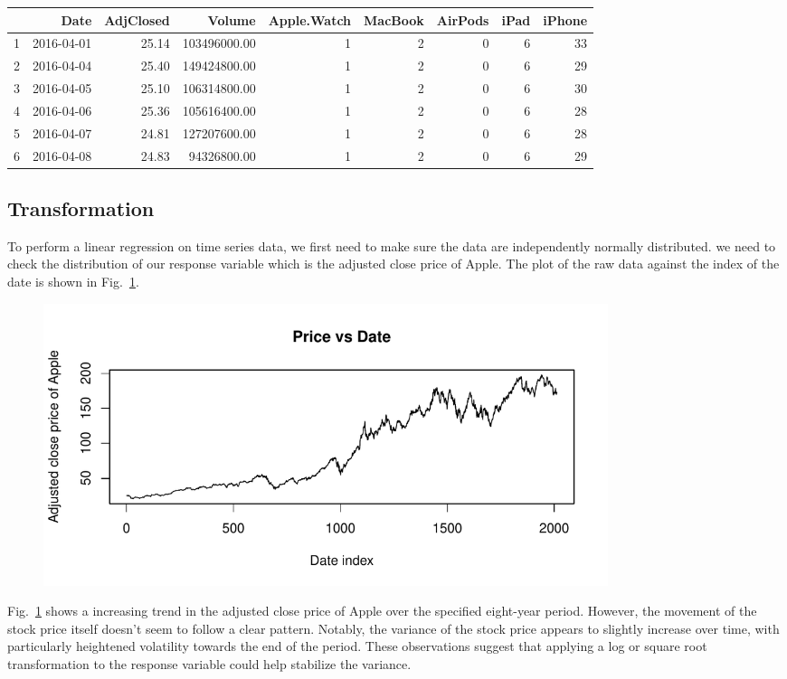 \documentclass[conference,onecolumn,11pt]{IEEEtran}
\begin{document}
\begin{table}[ht]
\centering
\begin{tabular}{rrrrrrrrr}
  \hline
 & Date & AdjClosed & Volume & Apple.Watch & MacBook & AirPods & iPad & iPhone \\ 
  \hline
1 & 2016-04-01 & 25.14 & 103496000.00 &   1 &   2 &   0 &   6 &  33 \\ 
  2 & 2016-04-04 & 25.40 & 149424800.00 &   1 &   2 &   0 &   6 &  29 \\ 
  3 & 2016-04-05 & 25.10 & 106314800.00 &   1 &   2 &   0 &   6 &  30 \\ 
  4 & 2016-04-06 & 25.36 & 105616400.00 &   1 &   2 &   0 &   6 &  28 \\ 
  5 & 2016-04-07 & 24.81 & 127207600.00 &   1 &   2 &   0 &   6 &  28 \\ 
  6 & 2016-04-08 & 24.83 & 94326800.00 &   1 &   2 &   0 &   6 &  29 \\ 
   \hline
\end{tabular}
\label{tab:merged_data}
\end{table}

\subsection*{Transformation}

To perform a linear regression on time series data, we first need to make sure the data are independently normally distributed. we need to check the distribution of our response variable which is the adjusted close price of Apple.
The plot of the raw data against the index of the date is shown in Fig.~\ref{fig:price}.

\begin{figure}[htpb]
	\centering
	\includegraphics[width=0.8\textwidth]{pic/Price_vs_Date.pdf}
	\caption{}
	\label{fig:price}
\end{figure}

Fig.~\ref{fig:price} shows a increasing trend in the adjusted close price of Apple over the specified eight-year period. However, the movement of the stock price itself doesn't seem to follow a clear pattern. Notably, the variance of the stock price appears to slightly increase over time, with particularly heightened volatility towards the end of the period. These observations suggest that applying a log or square root transformation to the response variable could help stabilize the variance. 
\end{document}
